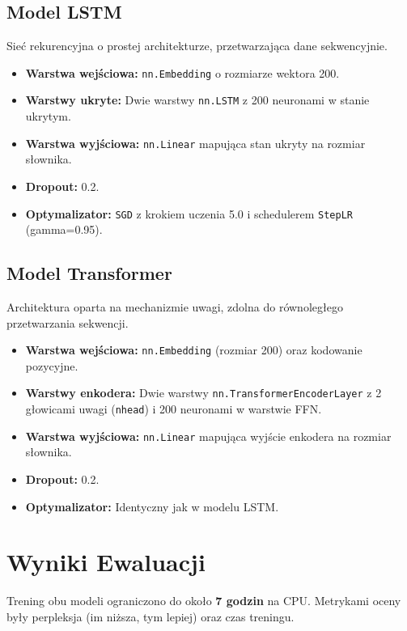 \documentclass[11pt, a4paper]{article}
\begin{document}
\subsection{Model LSTM}
Sieć rekurencyjna o prostej architekturze, przetwarzająca dane sekwencyjnie.
\begin{itemize}
    \item \textbf{Warstwa wejściowa:} \texttt{nn.Embedding} o rozmiarze wektora 200.
    \item \textbf{Warstwy ukryte:} Dwie warstwy \texttt{nn.LSTM} z 200 neuronami w stanie ukrytym.
    \item \textbf{Warstwa wyjściowa:} \texttt{nn.Linear} mapująca stan ukryty na rozmiar słownika.
    \item \textbf{Dropout:} 0.2.
    \item \textbf{Optymalizator:} \texttt{SGD} z krokiem uczenia 5.0 i schedulerem \texttt{StepLR} (gamma=0.95).
\end{itemize}

\subsection{Model Transformer}
Architektura oparta na mechanizmie uwagi, zdolna do równoległego przetwarzania sekwencji.
\begin{itemize}
    \item \textbf{Warstwa wejściowa:} \texttt{nn.Embedding} (rozmiar 200) oraz kodowanie pozycyjne.
    \item \textbf{Warstwy enkodera:} Dwie warstwy \texttt{nn.TransformerEncoderLayer} z 2 głowicami uwagi (\texttt{nhead}) i 200 neuronami w warstwie FFN.
    \item \textbf{Warstwa wyjściowa:} \texttt{nn.Linear} mapująca wyjście enkodera na rozmiar słownika.
    \item \textbf{Dropout:} 0.2.
    \item \textbf{Optymalizator:} Identyczny jak w modelu LSTM.
\end{itemize}

\section{Wyniki Ewaluacji}

Trening obu modeli ograniczono do około \textbf{7 godzin} na CPU. Metrykami oceny były perpleksja (im niższa, tym lepiej) oraz czas treningu.
\end{document}
